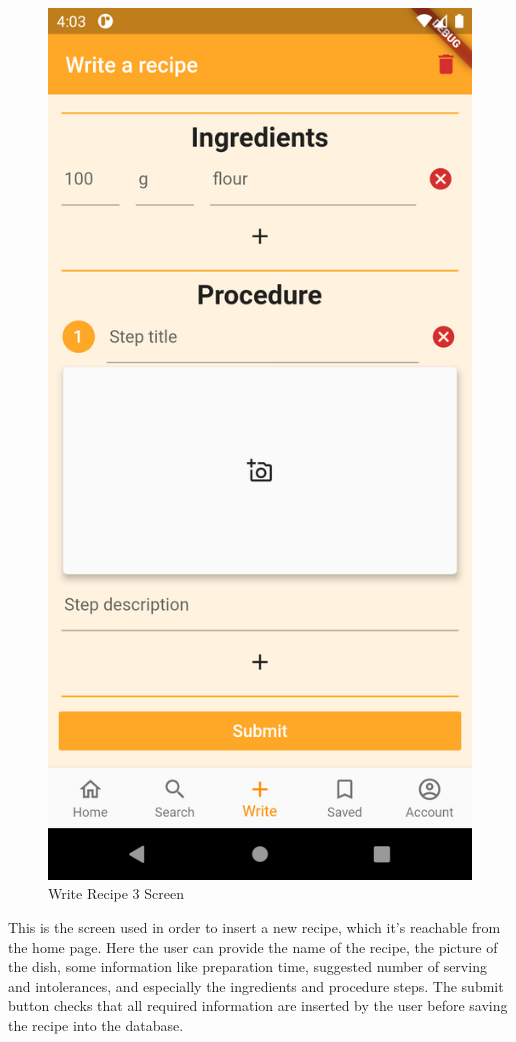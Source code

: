 \begin{figure}[H]
\begin{minipage}{0.31\textwidth}
		\includegraphics[width = .7\linewidth]{img/Write_3.png}
		\caption{Write Recipe 3 Screen}
	\end{minipage}
\end{figure}
This is the screen used in order to insert a new recipe, which it's reachable from the home page.
Here the user can provide the name of the recipe, the picture of the dish, some information like preparation time, suggested number of serving and intolerances, and especially the ingredients and procedure steps.
The submit button checks that all required information are inserted by the user before saving the recipe into the database.

